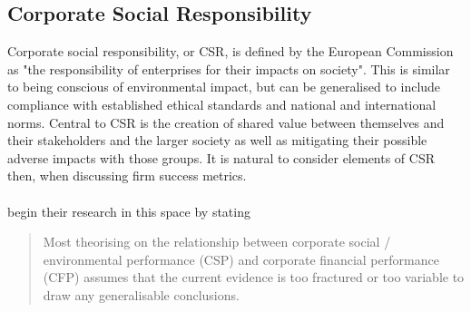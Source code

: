 \subsection{Corporate Social Responsibility}
{Corporate social responsibility, or CSR, is defined by the European Commission as "the responsibility of enterprises for their impacts on society". This is similar to being conscious of environmental impact, but can be generalised to include compliance with established ethical standards and national and international norms. Central to CSR is the creation of shared value between themselves and their stakeholders and the larger society as well as mitigating their possible adverse impacts with those groups. It is natural to consider elements of CSR then, when discussing firm success metrics. \\\\
\cite{orlitzky2003corporate} begin their research in this space by stating 
\begin{quote}
Most theorising on the relationship between corporate social / environmental performance (CSP) and corporate financial performance (CFP) assumes that the current evidence is too fractured or too variable to draw any generalisable conclusions.


\end{quote}}
